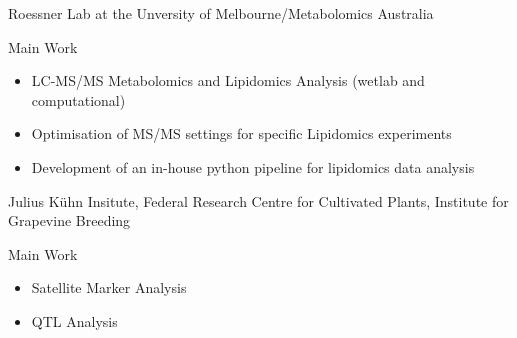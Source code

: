 {%
	}
{%
	Roessner Lab at the Unversity of Melbourne/Metabolomics Australia
}
{%
	\vspace*{.3cm}
	Main Work
	\begin{itemize}
		\item LC-MS/MS Metabolomics and Lipidomics Analysis (wetlab and computational)
		\item Optimisation of MS/MS settings for specific Lipidomics experiments
		\item Development of an in-house python pipeline for lipidomics data analysis
	\end{itemize}
}

{%
}
{%
	Julius K\"uhn Insitute, Federal Research Centre for Cultivated Plants, Institute for Grapevine Breeding
}
{%
	\vspace*{.3cm}
	Main Work
	\begin{itemize}
		\item Satellite Marker Analysis
		\item QTL Analysis
	\end{itemize}
}
